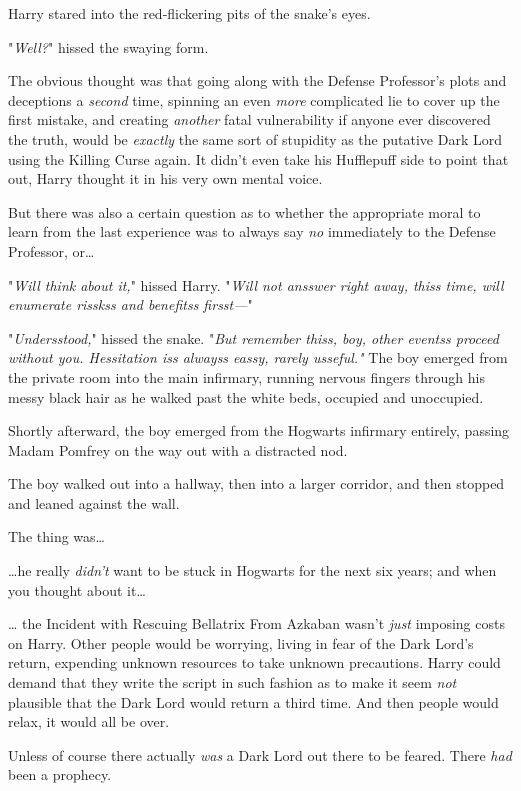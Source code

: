 Harry stared into the red-flickering pits of the snake's eyes.

"\emph{Well?}" hissed the swaying form.

The obvious thought was that going along with the Defense Professor's plots and 
deceptions a \emph{second} time, spinning an even \emph{more} complicated lie 
to cover up the first mistake, and creating \emph{another} fatal vulnerability 
if anyone ever discovered the truth, would be \emph{exactly} the same sort of 
stupidity as the putative Dark Lord using the Killing Curse again. It didn't 
even take his Hufflepuff side to point that out, Harry thought it in his very 
own mental voice.

But there was also a certain question as to whether the appropriate moral to 
learn from the last experience was to always say \emph{no} immediately to the 
Defense Professor, or{\ldots}

"\emph{Will think about it,}" hissed Harry. "\emph{Will not ansswer right away, 
thiss time, will enumerate risskss and benefitss firsst---}"

"\emph{Undersstood,}" hissed the snake. "\emph{But remember thiss, boy, other 
eventss proceed without you. Hessitation iss alwayss eassy, rarely usseful."}
\sbreak
The boy emerged from the private room into the main infirmary, running nervous 
fingers through his messy black hair as he walked past the white beds, occupied 
and unoccupied.

Shortly afterward, the boy emerged from the Hogwarts infirmary entirely, 
passing Madam Pomfrey on the way out with a distracted nod.

The boy walked out into a hallway, then into a larger corridor, and then 
stopped and leaned against the wall.

The thing was{\ldots}

{\ldots}he really \emph{didn't} want to be stuck in Hogwarts for the next six 
years; and when you thought about it{\ldots}

{\ldots} the Incident with Rescuing Bellatrix From Azkaban wasn't \emph{just} 
imposing costs on Harry. Other people would be worrying, living in fear of the 
Dark Lord's return, expending unknown resources to take unknown precautions. 
Harry could demand that they write the script in such fashion as to make it 
seem \emph{not} plausible that the Dark Lord would return a third time. And 
then people would relax, it would all be over.

Unless of course there actually \emph{was} a Dark Lord out there to be feared. 
There \emph{had} been a prophecy.

